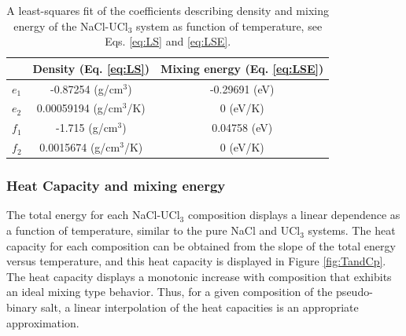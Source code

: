 \documentclass[preprint,3p,10pt,onecolumn,number,sort&compress]{elsarticle}
\begin{document}
{%


\begin{table}[hb!]
\centering
\begin{tabular}{lcc}
\hline
\hline
&Density (Eq. \ref{eq:LS}) &Mixing energy (Eq. \ref{eq:LSE}) \\
\hline
$e_1$  &-0.87254 (g/cm$^3$) &-0.29691 (eV) \\
$e_2$  &0.00059194 (g/cm$^3$/K) &0 (eV/K)\\
$f_1$ &-1.715 (g/cm$^3$) &0.04758 (eV) \\
$f_2$  &0.0015674 (g/cm$^3$/K) &0 (eV/K)\\
\hline
\hline
\end{tabular}
\caption{A least-squares fit of the coefficients describing density and mixing energy of the NaCl-UCl$_3$ system as function of temperature, see Eqs. \ref{eq:LS} and  \ref{eq:LSE}.}%
\label{table:LS}
\end{table}

\FloatBarrier

\subsubsection{Heat Capacity and mixing energy}
The total energy for each NaCl-UCl$_3$ composition displays a linear dependence as a function of temperature, similar to the pure NaCl and UCl$_3$ systems. The heat capacity for each composition can be obtained from the slope of the total energy versus temperature, and this heat capacity is displayed in Figure \ref{fig:TandCp}. The heat capacity displays a monotonic increase with composition that exhibits an ideal mixing type behavior. Thus, for a given composition of the pseudo-binary salt, a linear interpolation of the heat capacities is an appropriate approximation. 

}
\end{document}
